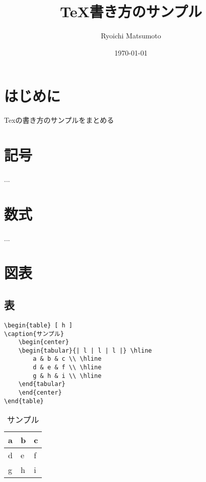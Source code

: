 \documentclass[11pt,a4paper]{jsarticle}
\title{TeX書き方のサンプル}
\author{Ryoichi Matsumoto}
\date{\today}
\begin{document}
\maketitle
%
%
\section{はじめに}
Texの書き方のサンプルをまとめる

\section{記号}
...

\section{数式}
...

\section{図表}

\subsection{表}

\begin{lstlisting}
\begin{table} [ h ]
\caption{サンプル}
	\begin{center}
	\begin{tabular}{| l | l | l |} \hline
		a & b & c \\ \hline
		d & e & f \\ \hline
		g & h & i \\ \hline
	\end{tabular}
	\end{center}
\end{table}
\end{lstlisting}

\begin{table} [ h ]
\caption{サンプル}
	\begin{center}
	\begin{tabular}{| l | l | l |} \hline
		a & b & c \\ \hline
		d & e & f \\ \hline
		g & h & i \\ \hline
	\end{tabular}
	\end{center}
\end{table}
\end{document}
